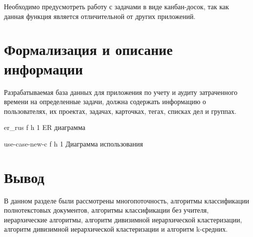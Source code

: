 Необходимо предусмотреть работу с задачами в виде канбан-досок, так как данная функция является отличительной от других приложений.

\section{Формализация и описание информации}
 
Разрабатываемая база данных для приложения по учету и аудиту затраченного времени на определенные задачи, должна содержать информацию о пользователях, их проектах, задачах, карточках, тегах, списках дел и группах.

{er_rus} %
{f} %
{h} %
{1\textwidth} %
{ER диаграмма} %
\clearpage

{use-case-new-c} %
{f} %
{h} %
{1\textwidth} %
{Диаграмма использования} %
\clearpage



\section *{Вывод}
В данном разделе были рассмотрены многопоточность, алгоритмы классификации полнотекстовых документов, алгоритмы классификации без учителя, иерархические алгоритмы, алгоритм дивизимной иерархической кластеризации, алгоритм дивизимной иерархической кластеризации и алгоритм k-средних.
